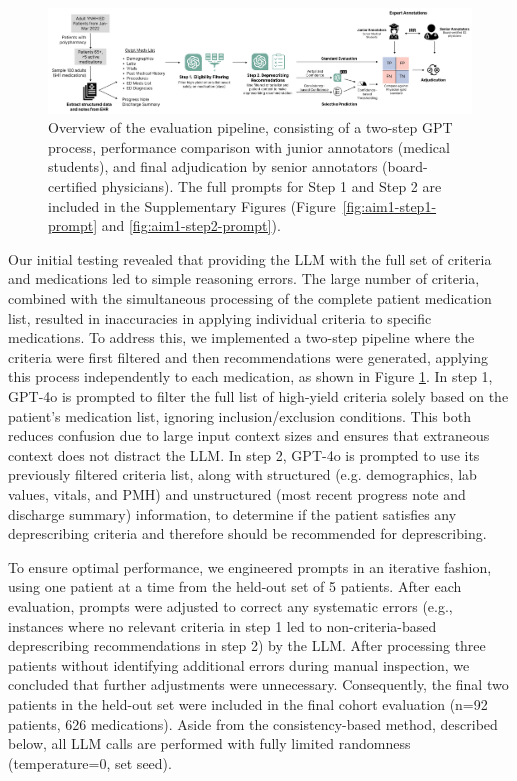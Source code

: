 \begin{figure}[!htbp]
	\centering
	\includegraphics[width=1\textwidth] {figures/aim1/methods_overview.png}
	\caption{Overview of the evaluation pipeline, consisting of a two-step GPT process, performance comparison with junior annotators (medical students), and final adjudication by senior annotators (board-certified physicians). The full prompts for Step 1 and Step 2 are included in the Supplementary Figures (Figure~\ref{fig:aim1-step1-prompt} and \ref{fig:aim1-step2-prompt}).} \label{fig:aim1-overview}
\end{figure}


Our initial testing revealed that providing the LLM with the full set of criteria and medications led to simple reasoning errors. The large number of criteria, combined with the simultaneous processing of the complete patient medication list, resulted in inaccuracies in applying individual criteria to specific medications. To address this, we implemented a two-step pipeline where the criteria were first filtered and then recommendations were generated, applying this process independently to each medication, as shown in Figure \ref{fig:aim1-overview}. In step 1, GPT-4o is prompted to filter the full list of high-yield criteria solely based on the patient's medication list, ignoring inclusion/exclusion conditions. This both reduces confusion due to large input context sizes\citep{liuLostMiddleHow2024} and ensures that extraneous context does not  distract the LLM\citep{shiLargeLanguageModels2023}. In step 2, GPT-4o is prompted to use its previously filtered criteria list, along with structured (e.g. demographics, lab values, vitals, and PMH) and unstructured (most recent progress note and discharge summary) information, to determine if the patient satisfies any deprescribing criteria and therefore should be recommended for deprescribing. 

To ensure optimal performance, we engineered prompts in an iterative fashion\citep{safranekAutomatedHEARTScore2024}, using one patient at a time from the held-out set of 5 patients. After each evaluation, prompts were adjusted to correct any systematic errors (e.g., instances where no relevant criteria in step 1 led to non-criteria-based deprescribing recommendations in step 2) by the LLM. After processing three patients without identifying additional errors during manual inspection, we concluded that further adjustments were unnecessary. Consequently, the final two patients in the held-out set were included in the final cohort evaluation (n=92 patients, 626 medications). Aside from the consistency-based method, described below, all LLM calls are performed with fully limited randomness (temperature=0, set seed). 

